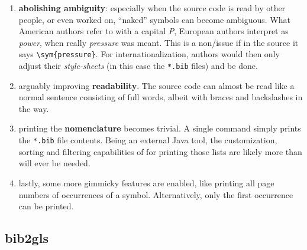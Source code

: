 \begin{enumerate}
        Yet, what is \emph{meant} is \emph{emphasis}; italic text is just what it
        happens to look like now, but it is not the \emph{meaning}.
        For example, we could later decide to redefine emphasized text to bold,
        or colored.
        If you previously did not differentiate strictly enough between
        \verb|\emph| and \verb|\textit|, you are in for a bad time.
        This is a trap beginners unfortunately often fall into.
        Using , abstracted markup\-/commands can be
        taken to a whole next level, leveraging this core \LaTeX{} strength.
    \item \textbf{abolishing ambiguity}:
        especially when the source code is read by other people, or even worked on,
        \enquote{naked} symbols can become ambiguous.
        What American authors refer to with a capital \emph{P}, European authors
        interpret as \emph{power}, when really \emph{pressure} was meant.
        This is a non\-/issue if in the source it says \verb|\sym{pressure}|.
        For internationalization, authors would then only adjust their
        \emph{style-sheets} (in this case the \texttt{*.bib} files) and be done.
    \item arguably improving \textbf{readability}.
        The source code can almost be read like a normal sentence consisting of full
        words, albeit with braces and backslashes in the way.
    \item printing the \textbf{nomenclature} becomes trivial.
        A single command simply prints the \texttt{*.bib} file contents.
        Being an external Java tool, the customization, sorting and filtering
        capabilities of  for printing those lists are likely
        more than will ever be needed.
    \item lastly, some more gimmicky features are enabled, like printing all
        page numbers of occurrences of a symbol.
        Alternatively, only the first occurrence can be printed.
\end{enumerate}

\subsection{bib2gls}

